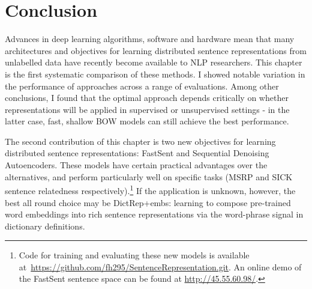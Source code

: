 
\section{Conclusion}

Advances in deep learning algorithms, software and hardware mean that many architectures and objectives for learning distributed sentence representations from unlabelled data have recently become available to NLP researchers. This chapter is the first systematic comparison of these methods. I showed notable variation in the performance of approaches across a range of evaluations. Among other conclusions, I found that the optimal approach depends critically on whether representations will be applied in supervised or unsupervised settings - in the latter case, fast, shallow BOW models can still achieve the best performance. 

The second contribution of this chapter is two new objectives for learning distributed sentence representations: FastSent and Sequential Denoising Autoencoders. These models have certain practical advantages over the alternatives, and perform particularly well on specific tasks (MSRP and SICK sentence relatedness respectively).\footnote{Code for training and evaluating these new models is available at~\url{https://github.com/fh295/SentenceRepresentation.git}. An online demo of the FastSent sentence space can be found at \url{http://45.55.60.98/}.} If the application is unknown, however, the best all round choice may be DictRep+embs: learning to compose pre-trained word embeddings into rich sentence representations via the word-phrase signal in dictionary definitions. 

